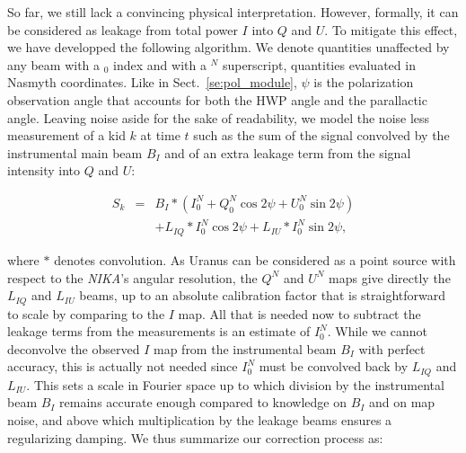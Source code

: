 \documentclass[twocolumn,traditabstract]{aa}
\newcommand{\nika}{{\it NIKA}}
\begin{document}
{So far, we still lack a convincing physical interpretation. However, formally,
it can be considered as leakage from total power $I$ into $Q$ and $U$. To
mitigate this effect, we have developped the following algorithm. We denote
quantities unaffected by any beam with a $_0$ index and with a $^N$ superscript,
quantities evaluated in Nasmyth coordinates. Like in Sect.~\ref{se:pol_module},
$\psi$ is the polarization observation angle that accounts for both the HWP
angle and the parallactic angle. Leaving noise aside for the sake of
readability, we model the noise less measurement of a kid $k$ at time $t$ such
as the sum of the signal convolved by the instrumental main beam $B_I$ and of an
extra leakage term from the signal intensity into $Q$ and $U$:

\begin{eqnarray}
S_k &=& B_I * (I^N_0 + Q^N_0\cos2\psi + U^N_0\sin2\psi) \nonumber \\
       &&+ L_{IQ}*I^N_0\cos2\psi + L_{IU}*I^N_0\sin2\psi,
\label{eq_leak}
\end{eqnarray}

where $*$ denotes convolution. As Uranus can be considered as a point source
with respect to the \nika's angular resolution, the $Q^N$ and $U^N$ maps give
directly the $L_{ IQ}$ and $L_{ IU}$ beams, up to an absolute calibration factor
that is straightforward to scale by comparing to the $I$ map. All that is needed
now to subtract the leakage terms from the measurements is an estimate of
$I^N_0$. While we cannot deconvolve the observed $I$ map from the instrumental
beam $B_I$ with perfect accuracy, this is actually not needed since $I^N_0$ must
be convolved back by $L_{IQ}$ and $L_{IU}$. This sets a scale in Fourier space
up to which division by the instrumental beam $B_I$ remains accurate enough
compared to knowledge on $B_I$ and on map noise, and above which multiplication
by the leakage beams ensures a regularizing damping. We thus summarize our
correction process as:

}
\end{document}
